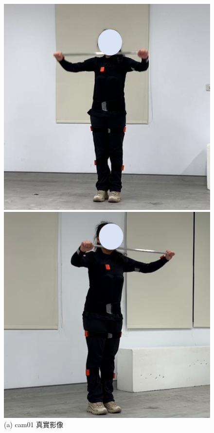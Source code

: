 \begin{figure}[!ht]
   \centering
   \begin{minipage}{.5\textwidth}
      \centering
      \includegraphics[width=.95\linewidth]{figure/ch4_fig_bar_cam01_with1.jpg}
      \caption*{(a) cam01 真實影像}
    \end{minipage}%
    \begin{minipage}{.5\textwidth}
       \centering
       \includegraphics[width=.95\linewidth]{figure/ch4_fig_bar_cam02_with1.jpg}

\end{minipage}
\end{figure}
